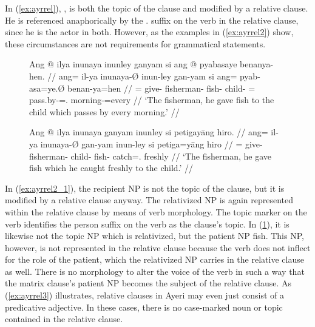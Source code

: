 In (\ref{ex:ayrrel}), , is both the topic
of the clause and modified by a relative clause. He is referenced anaphorically
by the \TsgM{}.\Aarg{} suffix  on the verb in the
relative clause, since he is the actor in both. However, as the examples in 
(\ref{ex:ayrrel2}) show, these circumstances are not requirements for grammatical statements.

\begin{figure}[h]
\pex\label{ex:ayrrel2}
\a\label{ex:ayrrel2_1}\begingl
	\gla Ang @ ilya inunaya inunley ganyam si ang @ pyabasaye benanya-hen. //
	\glb ang= il-ya inunaya-Ø inun-ley gan-yam si ang= pyab-asa=ye.Ø 
		benan-ya=hen //
	\glc \AgtT{}= give-\TsgM{} fisherman-\Top{} fish-\PargI{} child-\Dat{}
		\Rel{} \AgtT{}= pass.by-\Hab{}=\TsgF{}.\Top{} morning-\Loc{}=every //
	\glft `The fisherman, he gave fish to the child which passes by every
		morning.' //
\endgl

\a\label{ex:ayrrel2_2}\begingl
	\gla Ang @ ilya inunaya ganyam inunley si petigayāng hiro. //
	\glb ang= il-ya inunaya-Ø gan-yam inun-ley si petiga=yāng hiro //
	\glc \AgtT{}= give-\TsgM{} fisherman-\Top{} child-\Dat{} fish-\PargI{}
		\Rel{} catch=\TsgM{}.\Aarg{} freshly //
	\glft `The fisherman, he gave fish which he caught freshly to the 
		child.' //
\endgl
\xe
\end{figure}

In (\ref{ex:ayrrel2_1}), the recipient NP 
is not the topic of the clause, but it is modified by a relative clause anyway.
The relativized NP is again represented within the relative clause by means of
verb morphology. The topic marker on the verb identifies the person suffix on
the verb as the clause's topic. In (\ref{ex:ayrrel2_2}), it is likewise not the
topic NP which is relativized, but the patient NP 
{fish}. This NP, however, is not represented in the relative clause because the
verb does not inflect for the role of the patient, which the relativized NP
carries in the relative clause as well. There is no morphology to alter the
voice of the verb in such a way that the matrix clause's patient NP becomes the
subject of the relative clause. As (\ref{ex:ayrrel3}) illustrates, relative
clauses in Ayeri may even just consist of a predicative adjective. In these
cases, there is no case-marked noun or topic contained in the relative clause.

